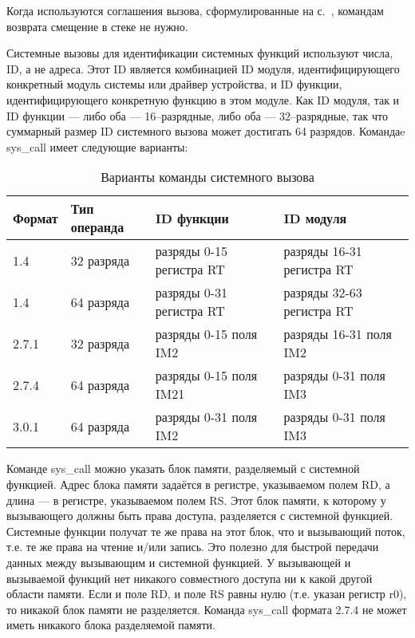\documentclass[forwardcom.tex]{subfiles}
\begin{document}
Когда используются соглашения вызова, сформулированные на с.~\pageref{functionCallingConventions}, командам возврата смещение в стеке не нужно.

\label{systemCallInstruction}
Системные вызовы для идентификации системных функций используют числа, ID, а не адреса. Этот ID является комбинацией ID модуля, идентифицирующего конкретный модуль системы или драйвер устройства, и ID функции, идентифицирующего конкретную функцию в этом модуле. Как ID модуля, так и ID функции --- либо оба --- 16--разрядные, либо оба --- 32--разрядные, так что суммарный размер ID системного вызова может достигать 64 разрядов. Командаe sys\_call имеет следующие варианты:

\begin{longtable}{|l|l|p{44mm}|p{44mm}|}
\caption{Варианты команды системного вызова}
\label{table:syscallInstructions}
\endfirsthead
\endhead
\hline
Формат  & Тип операнда & ID функции               & ID модуля                  \\ \hline
1.4     & 32 разряда   & разряды 0-15 регистра RT & разряды 16-31 регистра RT  \\ \hline
1.4     & 64 разряда   & разряды 0-31 регистра RT & разряды 32-63 регистра RT  \\ \hline
2.7.1   & 32 разряда   & разряды 0-15 поля IM2    & разряды 16-31 поля IM2     \\ \hline
2.7.4   & 64 разряда   & разряды 0-15 поля IM21   & разряды 0-31 поля IM3      \\ \hline
3.0.1   & 64 разряда   & разряды 0-31 поля IM2    & разряды 0-31 поля IM3      \\ \hline
\end{longtable}

Команде sys\_call можно указать блок памяти, разделяемый с системной функцией. Адрес блока памяти задаётся в регистре, указываемом полем RD, а длина --- в регистре, указываемом полем RS. Этот блок памяти, к которому у вызывающего должны быть права доступа, разделяется с системной функцией. Системные функции получат те же права на этот блок, что и вызывающий поток, т.е. те же права на чтение и/или запись. Это полезно для быстрой передачи данных между вызывающим и системной функцией. У вызывающей и вызываемой функций нет никакого совместного доступа ни к какой другой области памяти. Если и поле RD, и поле RS равны нулю (т.е. указан регистр r0), то никакой блок памяти не разделяется. Команда sys\_call формата 2.7.4 не может иметь никакого блока разделяемой памяти.
\end{document}

